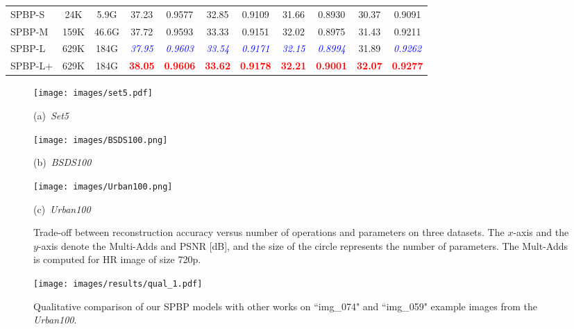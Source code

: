 \documentclass[a4paper,11pt]{article}
\begin{document}
\begin{table}[!ht]
\begin{adjustbox}{width=\columnwidth,center}
\begin{tabular}{l c c c|c||c|c||c|c||c|c}
			
\midrule
			SPBP-S & 24K & 5.9G &  37.23  & 0.9577  &  32.85 &  0.9109 & 31.66 &  0.8930 & 30.37 &  0.9091 \\
			SPBP-M & 159K & 46.6G & 37.72  & 0.9593 &  33.33 &  0.9151 & 32.02 &  0.8975 & 31.43 &  0.9211 \\
			SPBP-L & 629K & 184G &  \textit{\textcolor{blue}{37.95}}  & \textit{\textcolor{blue}{0.9603}} &  \textit{\textcolor{blue}{33.54}} &  \textit{\textcolor{blue}{0.9171}} &\textit{\textcolor{blue}{32.15}} &  \textit{\textcolor{blue}{0.8994}} & 31.89 &  \textit{\textcolor{blue}{0.9262}} \\	
			SPBP-L+ & 629K & 184G &  \textbf{\textcolor{red}{38.05}}  & \textbf{\textcolor{red}{0.9606}} &  \textbf{\textcolor{red}{33.62}} &  \textbf{\textcolor{red}{0.9178}} &  \textbf{\textcolor{red}{32.21}} &  \textbf{\textcolor{red}{0.9001}} & \textbf{\textcolor{red}{32.07}} &  \textbf{\textcolor{red}{0.9277}}\\

\bottomrule
\end{tabular}
\end{adjustbox}   
\label{tab:quantresults}
\end{table}

\begin{figure*}[!ht]
\centering
\begin{minipage}[h]{.32\linewidth}
	\centerline{\texttt{[image: images/set5.pdf]}}
	\centerline{(a)~\textit{Set5}~\cite{Yang_image}}
\end{minipage}
\begin{minipage}[h]{.32\linewidth}
	\centerline{\texttt{[image: images/BSDS100.png]}}
	\centerline{(b)~\textit{BSDS100}~\cite{arbelaez2010contour}}
\end{minipage}
\begin{minipage}[h]{.32\linewidth}
	\centerline{\texttt{[image: images/Urban100.png]}}
	\centerline{(c)~\textit{Urban100}~\cite{Urban}}
\end{minipage}
        \caption{Trade-off between reconstruction accuracy versus number of operations and parameters on three datasets. The $x$-axis and the $y$-axis denote the Multi-Adds and PSNR [dB],  and the size of the circle represents the number of parameters. The Mult-Adds is computed for HR image of size 720p.}
\label{performance}
\end{figure*}

\begin{figure}[!ht]
        \centering
        \texttt{[image: images/results/qual\_1.pdf]}
\caption{Qualitative comparison of our SPBP models with other works on ``img\_074" and ``img\_059" example images from the \textit{Urban100}.} 
\label{performance_visual_1}   
\end{figure}
\end{document}
